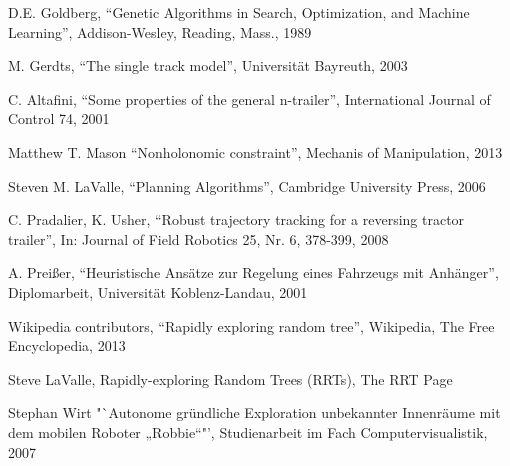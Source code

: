\documentclass[bsc,en,
oneside,12pt,utf8,a4paper,
]{thesisdifctunl}
\begin{document}
\begin{thebibliography}{9}
	D.E. Goldberg,
	"`Genetic Algorithms in Search, Optimization, and Machine Learning"',
	Addison-Wesley, Reading, Mass.,
	1989
	
	M. Gerdts,
	"`The single track model"',
	Universität Bayreuth,
	2003
	
	C. Altafini,
	"`Some properties of the general n-trailer"',
	International Journal of Control 74,
	2001
	
	Matthew T. Mason
	"`Nonholonomic constraint"',
	Mechanis of Manipulation,
	2013
	
	Steven M. LaValle,
	"`Planning Algorithms"',
	Cambridge University Press,
	2006
	
	C. Pradalier, K. Usher,
	"`Robust trajectory tracking for a reversing tractor trailer"',
	In: Journal of Field Robotics 25, Nr. 6, 378-399,
	2008
	
	A. Preißer,
	"`Heuristische Ansätze zur Regelung eines Fahrzeugs mit Anhänger"',
	Diplomarbeit, Universität Koblenz-Landau,
	2001
	
	Wikipedia contributors,
	"`Rapidly exploring random tree"',
	Wikipedia, The Free Encyclopedia,
	2013
	
	Steve LaValle,
	Rapidly-exploring Random Trees (RRTs),
	The RRT Page

	Stephan Wirt
	"`Autonome gründliche Exploration unbekannter Innenräume mit dem mobilen Roboter „Robbie“"',
	Studienarbeit im Fach Computervisualistik,
	2007

\end{thebibliography}


\end{document}
